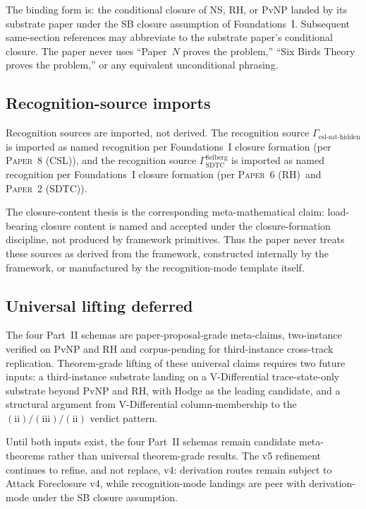 \documentclass[11pt]{article}
\newcommand{\PaperSDTC}{\textsc{Paper~2 (SDTC)}}
\newcommand{\PaperRH}{\textsc{Paper~6 (RH)}}
\newcommand{\PaperCSL}{\textsc{Paper~8 (CSL)}}
\newcommand{\SigPattern}{$\mathrm{(ii)}/\mathrm{(iii)}/\mathrm{(ii)}$}
\theoremstyle{definition}
\begin{document}
The binding form is: the conditional closure of NS, RH, or PvNP landed
by its substrate paper under the SB closure assumption of
Foundations~I.  Subsequent same-section references may abbreviate to
the substrate paper's conditional closure.  The paper never uses
``Paper~\(N\) proves the problem,'' ``Six Birds Theory proves the
problem,'' or any equivalent unconditional phrasing.

\subsection{Recognition-source imports}\label{sec:scope:recognition-source-imports}

Recognition sources are imported, not derived.  The recognition source
\(\Gamma_{\mathrm{csl\text{-}sat\text{-}hidden}}\) is imported as
named recognition per Foundations~I closure formation (per \PaperCSL),
and the recognition source
\(\Gamma_{\mathrm{SDTC}}^{\mathrm{Selberg}}\) is imported as named
recognition per Foundations~I closure formation (per \PaperRH\ and
\PaperSDTC).

The closure-content thesis is the corresponding meta-mathematical
claim: load-bearing closure content is named and accepted under the
closure-formation discipline, not produced by framework primitives.
Thus the paper never treats these sources as derived from the
framework, constructed internally by the framework, or manufactured by
the recognition-mode template itself.

\subsection{Universal lifting deferred}\label{sec:scope:universal-lifting-deferred}

The four Part~II schemas are paper-proposal-grade meta-claims,
two-instance verified on PvNP and RH and corpus-pending for
third-instance cross-track replication.  Theorem-grade lifting of these universal claims requires
two future inputs: a third-instance substrate landing on a
V-Differential trace-state-only substrate beyond PvNP and RH, with
Hodge as the leading candidate, and a structural argument from
V-Differential column-membership to the \SigPattern{} verdict pattern.

Until both inputs exist, the four Part~II schemas remain candidate
meta-theorems rather than universal theorem-grade results.  The v5 refinement continues to
refine, and not replace, v4: derivation routes remain subject to
Attack Foreclosure v4, while recognition-mode landings are peer with
derivation-mode under the SB closure assumption.
\end{document}
